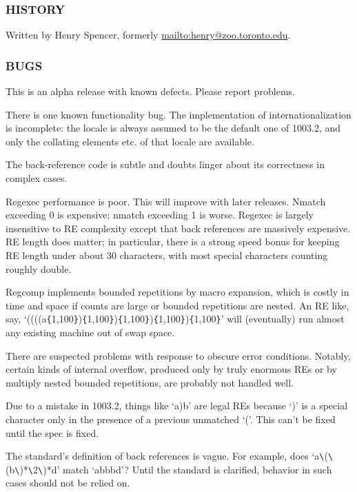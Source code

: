 \subsubsection{HISTORY}

Written by Henry Spencer, formerly \url{mailto:henry@zoo.toronto.edu}.

\subsubsection{BUGS}%
\label{sec:mre3bugs}

This is an alpha release with known defects. Please report problems.

There is one known functionality bug. The implementation of
internationalization is incomplete: the locale is always assumed to be
the default one of 1003.2, and only the collating elements etc. of
that locale are available.

The back-reference code is subtle and doubts linger about its
correctness in complex cases.

Regexec performance is poor. This will improve with later releases.
Nmatch exceeding 0 is expensive; nmatch exceeding 1 is worse. Regexec
is largely insensitive to RE complexity except that back references
are massively expensive. RE length does matter; in particular, there
is a strong speed bonus for keeping RE length under about 30
characters, with most special characters counting roughly double.

Regcomp implements bounded repetitions by macro expansion, which is
costly in time and space if counts are large or bounded repetitions
are nested. An RE like, say,
`((((a\verb|{|1,100\verb|}|)\verb|{|1,100\verb|}|)\verb|{|1,100\verb|}|)\verb|{|1,100\verb|}|)\verb|{|1,100\verb|}|'
will (eventually) run almost any existing machine out of swap space.

There are suspected problems with response to obscure error
conditions. Notably, certain kinds of internal overflow, produced only
by truly enormous REs or by multiply nested bounded repetitions, are
probably not handled well.

Due to a mistake in 1003.2, things like `a)b' are legal REs because
`)' is a special character only in the presence of a previous
unmatched `('. This can't be fixed until the spec is fixed.

The standard's definition of back references is vague. For example,
does `a\verb|\|(\verb|\|(b\verb|\|)*\verb|\|2\verb|\|)*d' match
`abbbd'? Until the standard is clarified, behavior in such cases
should not be relied on.

